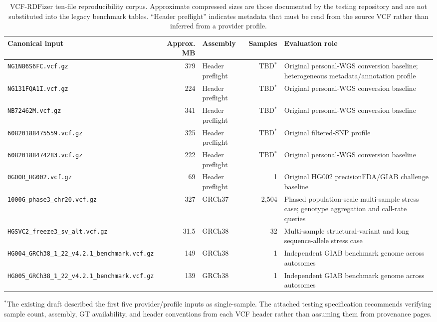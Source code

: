 \documentclass[pdflatex,sn-mathphys-num]{sn-jnl}%
\newenvironment{revision}{\begingroup\color{revisionblue}}{\endgroup}%
\theoremstyle{thmstyleone}%
\theoremstyle{thmstyletwo}%
\theoremstyle{thmstylethree}%
\begin{document}
\begin{revision}
\begin{table}[t]
\caption{VCF-RDFizer ten-file reproducibility corpus. Approximate compressed sizes are those documented by the testing repository and are not substituted into the legacy benchmark tables. ``Header preflight'' indicates metadata that must be read from the source VCF rather than inferred from a provider profile.}\label{tab:test-corpus}%
\centering
\scriptsize
\setlength{\tabcolsep}{3pt}
\renewcommand{\arraystretch}{0.95}
\begin{tabularx}{\textwidth}{@{}p{}r p{}r X@{}}
\toprule
\textbf{Canonical input} & \textbf{Approx. MB} & \textbf{Assembly} & \textbf{Samples} & \textbf{Evaluation role} \\
\midrule
\texttt{NG1N86S6FC.vcf.gz} & 379 & Header preflight & TBD$^{*}$ & Original personal-WGS conversion baseline; heterogeneous metadata/annotation profile \\
\texttt{NG131FQA1I.vcf.gz} & 224 & Header preflight & TBD$^{*}$ & Original personal-WGS conversion baseline \\
\texttt{NB72462M.vcf.gz} & 341 & Header preflight & TBD$^{*}$ & Original personal-WGS conversion baseline \\
\texttt{60820188475559.vcf.gz} & 325 & Header preflight & TBD$^{*}$ & Original filtered-SNP profile \\
\texttt{60820188474283.vcf.gz} & 222 & Header preflight & TBD$^{*}$ & Original personal-WGS conversion baseline \\
\texttt{0GOOR\_HG002.vcf.gz} & 69 & Header preflight & 1 & Original HG002 precisionFDA/GIAB challenge baseline \\
\midrule
\texttt{1000G\_phase3\_chr20.vcf.gz} & 327 & GRCh37 & 2,504 & Phased population-scale multi-sample stress case; genotype aggregation and call-rate queries \\
\texttt{HGSVC2\_freeze3\_sv\_alt.vcf.gz} & 31.5 & GRCh38 & 32 & Multi-sample structural-variant and long sequence-allele stress case \\
\texttt{HG004\_GRCh38\_1\_22\_v4.2.1\_benchmark.vcf.gz} & 149 & GRCh38 & 1 & Independent GIAB benchmark genome across autosomes \\
\texttt{HG005\_GRCh38\_1\_22\_v4.2.1\_benchmark.vcf.gz} & 139 & GRCh38 & 1 & Independent GIAB benchmark genome across autosomes \\
\bottomrule
\end{tabularx}
\vspace{1mm}
\parbox{0.97\textwidth}{\footnotesize $^{*}$The existing draft described the first five provider/profile inputs as single-sample. The attached testing specification recommends verifying sample count, assembly, GT availability, and header conventions from each VCF header rather than assuming them from provenance pages.}
\end{table}
\end{revision}
\end{document}
